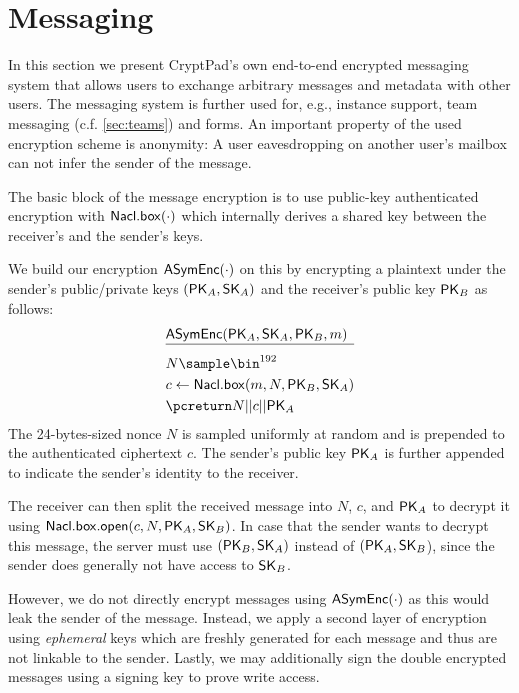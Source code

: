 \section{Messaging}
\label{sec:mailbox}

In this section we present CryptPad's own end-to-end encrypted messaging system that allows users to exchange arbitrary messages and metadata with other users.
The messaging system is further used for, e.g., instance support, team messaging (c.f. \cref{sec:teams}) and forms.
An important property of the used encryption scheme is anonymity: A user eavesdropping on another user's mailbox can not infer the sender of the message.

The basic block of the message encryption is to use public-key authenticated encryption with $\myAlgofont{Nacl.box}(\cdot)$ which internally derives a shared key between the receiver's and the sender's keys.

We build our encryption $\myASymEnc{\cdot}$ on this by encrypting a plaintext under the sender's public/private keys $\myKeyPair{_A}$ and the receiver's public key $\myPK_B$  as follows:
\begin{align*}
&\myASymEnc{\myPK_A, \mySK_A, \myPK_B, m}\\[-2.5ex]
&\rule{\widthof{$c \gets \myAlgofont{Nacl.box}(m, N, \myPK_B, \mySK_A)$}}{0.4pt}\\ %
&N \sample \bin^{192}\\
&c \gets \myAlgofont{Nacl.box}(m, N, \myPK_B, \mySK_A)\\
&\pcreturn N || c || \myPK_A
\end{align*}
The 24-bytes-sized nonce $N$ is sampled uniformly at random and is prepended to the authenticated ciphertext $c$.
The sender's public key $\myPK_A$ is further appended to indicate the sender's identity to the receiver.

The receiver can then split the received message into $N$, $c$, and $\myPK_A$ to decrypt it using $\myAlgofont{Nacl.box.open}(c, N, \myPK_A, \mySK_B)$.
In case that the sender wants to decrypt this message, the server must use $(\myPK_B, \mySK_A)$ instead of $(\myPK_A,\mySK_B$), since the sender does generally not have access to $\mySK_B$.

However, we do not directly encrypt messages using $\myASymEnc{\cdot}$ as this would leak the sender of the message.
Instead, we apply a second layer of encryption using \textit{ephemeral} keys which are freshly generated for each message and thus are not linkable to the sender.
Lastly, we may additionally sign the double encrypted messages using a signing key to prove write access.

